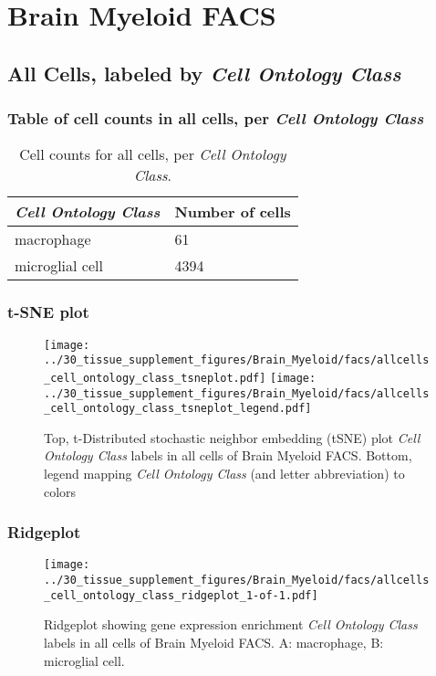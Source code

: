 \clearpage
\section{Brain Myeloid FACS}

\subsection{All Cells, labeled by \emph{Cell Ontology Class}}
\subsubsection{Table of cell counts in all cells, per \emph{Cell Ontology Class}}\begin{table}[h]
\centering
\label{my-label}
\begin{tabular}{@{}ll@{}}
\toprule

\emph{Cell Ontology Class}& Number of cells \\ \midrule
macrophage & 61 \\

microglial cell & 4394 \\
\bottomrule
\end{tabular}
\caption{Cell counts for all cells, per \emph{Cell Ontology Class}.}
\end{table}

\clearpage
\subsubsection{t-SNE plot}
\begin{figure}[h]
\centering
\texttt{[image: ../30\_tissue\_supplement\_figures/Brain\_Myeloid/facs/allcells\_cell\_ontology\_class\_tsneplot.pdf]}
\texttt{[image: ../30\_tissue\_supplement\_figures/Brain\_Myeloid/facs/allcells\_cell\_ontology\_class\_tsneplot\_legend.pdf]}
\caption{Top, t-Distributed stochastic neighbor embedding (tSNE) plot  \emph{Cell Ontology Class} labels in all cells of Brain Myeloid FACS. Bottom, legend mapping \emph{Cell Ontology Class} (and letter abbreviation) to colors}
\end{figure}


\clearpage

\subsubsection{Ridgeplot}
\begin{figure}[h]
\centering
\texttt{[image: ../30\_tissue\_supplement\_figures/Brain\_Myeloid/facs/allcells\_cell\_ontology\_class\_ridgeplot\_1-of-1.pdf]}

\caption{ Ridgeplot  showing gene expression enrichment \emph{Cell Ontology Class} labels in all cells of Brain Myeloid FACS. A: macrophage, B: microglial cell.}
\end{figure}


